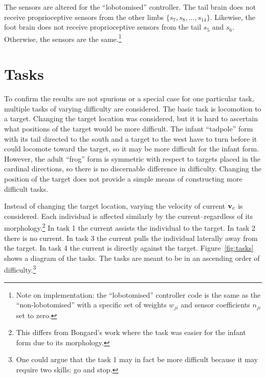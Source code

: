 The sensors are altered for the ``lobotomised'' controller.  The tail
brain does not receive proprioceptive sensors from the other limbs
$\{s_7, s_8, \ldots, s_{14}\}$.  Likewise, the foot brain does not
receive proprioceptive sensors from the tail $s_5$ and $s_6$.
Otherwise, the sensors are the same.\footnote{Note on implementation:
  the ``lobotomised'' controller code is the same as the
  ``non-lobotomised'' with a specific set of weights $w_{ji}$ and
  sensor coefficients $n_{ji}$ set to zero.}

\section{Tasks}

To confirm the results are not spurious or a special case for one
particular task, multiple tasks of varying difficulty are considered.
The basic task is locomotion to a target.  Changing the target
location was considered, but it is hard to ascertain what positions of
the target would be more difficult.  The infant ``tadpole'' form with
its tail directed to the south and a target to the west have to turn
before it could locomote toward the target, so it may be more
difficult for the infant form.  However, the adult ``frog'' form is
symmetric with respect to targets placed in the cardinal directions,
so there is no discernable difference in difficulty.  Changing the
position of the target does not provide a simple means of constructing
more difficult tasks.  

Instead of changing the target location, varying the velocity of
current $\mathbf{v}_c$ is considered.  Each individual is affected
similarly by the current--regardless of its morphology.\footnote{This
  differs from Bongard's work where the task was easier for the infant
  form due to its morphology.}  In task 1 the current assists the
individual to the target.  In task 2 there is no current.  In task 3
the current pulls the individual laterally away from the target.  In
task 4 the current is directly against the
target. Figure~\ref{fig:tasks} shows a diagram of the tasks.  The
tasks are meant to be in an ascending order of
difficulty.\footnote{One could argue that the task 1 may in fact be
  more difficult because it may require two skills: go and stop.}

